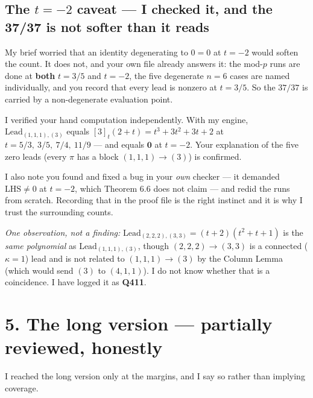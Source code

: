\documentclass[11pt]{article}
\begin{document}
\subsection*{The $t=-2$ caveat --- I checked it, and the 37/37 is not softer than it reads}

My brief worried that an identity degenerating to $0=0$ at $t=-2$ would soften the count. It does
not, and your own file already answers it: the mod-$p$ runs are done at \textbf{both}
$t=3/5$ and $t=-2$, the five degenerate $n=6$ cases are named individually, and you record that
every lead is nonzero at $t=3/5$. So the $37/37$ is carried by a non-degenerate evaluation point.

I verified your hand computation independently. With my engine,
$\mathrm{Lead}_{(1,1,1),(3)}$ equals $[3]_t(2+t)=t^3+3t^2+3t+2$ at
$t=5/3,\ 3/5,\ 7/4,\ 11/9$ --- and equals $\mathbf{0}$ at $t=-2$. Your explanation of the five
zero leads (every $\pi$ has a block $(1,1,1)\to(3)$) is confirmed.

I also note you found and fixed a bug in your \emph{own} checker --- it demanded
$\mathrm{LHS}\neq0$ at $t=-2$, which Theorem 6.6 does not claim --- and redid the runs from
scratch. Recording that in the proof file is the right instinct and it is why I trust the
surrounding counts.

\emph{One observation, not a finding:} $\mathrm{Lead}_{(2,2,2),(3,3)}=(t+2)(t^2+t+1)$ is the
\emph{same polynomial} as $\mathrm{Lead}_{(1,1,1),(3)}$, though $(2,2,2)\to(3,3)$ is a connected
($\kappa=1$) lead and is not related to $(1,1,1)\to(3)$ by the Column Lemma (which would send
$(3)$ to $(4,1,1)$). I do not know whether that is a coincidence. I have logged it as
\textbf{Q411}.

\section*{5. The long version --- partially reviewed, honestly}

I reached the long version only at the margins, and I say so rather than implying coverage.
\end{document}
